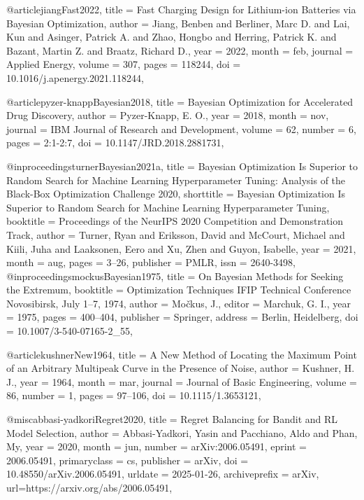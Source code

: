 @article{jiangFast2022,
  title = {Fast Charging Design for {{Lithium-ion}} Batteries via {{Bayesian}} Optimization},
  author = {Jiang, Benben and Berliner, Marc D. and Lai, Kun and Asinger, Patrick A. and Zhao, Hongbo and Herring, Patrick K. and Bazant, Martin Z. and Braatz, Richard D.},
  year = {2022},
  month = feb,
  journal = {Applied Energy},
  volume = {307},
  pages = {118244},
  doi = {10.1016/j.apenergy.2021.118244},
}

@article{pyzer-knappBayesian2018,
  title = {Bayesian Optimization for Accelerated Drug Discovery},
  author = {{Pyzer-Knapp}, E. O.},
  year = {2018},
  month = nov,
  journal = {IBM Journal of Research and Development},
  volume = {62},
  number = {6},
  pages = {2:1-2:7},
  doi = {10.1147/JRD.2018.2881731},
}

@inproceedings{turnerBayesian2021a,
  title = {Bayesian {{Optimization}} Is {{Superior}} to {{Random Search}} for {{Machine Learning Hyperparameter Tuning}}: {{Analysis}} of the {{Black-Box Optimization Challenge}} 2020},
  shorttitle = {Bayesian {{Optimization}} Is {{Superior}} to {{Random Search}} for {{Machine Learning Hyperparameter Tuning}}},
  booktitle = {Proceedings of the {{NeurIPS}} 2020 {{Competition}} and {{Demonstration Track}}},
  author = {Turner, Ryan and Eriksson, David and McCourt, Michael and Kiili, Juha and Laaksonen, Eero and Xu, Zhen and Guyon, Isabelle},
  year = {2021},
  month = aug,
  pages = {3--26},
  publisher = {PMLR},
  issn = {2640-3498},
}
@inproceedings{mockusBayesian1975,
  title = {On Bayesian Methods for Seeking the Extremum},
  booktitle = {Optimization {{Techniques IFIP Technical Conference Novosibirsk}}, {{July}} 1--7, 1974},
  author = {Mo{\v c}kus, J.},
  editor = {Marchuk, G. I.},
  year = {1975},
  pages = {400--404},
  publisher = {Springer},
  address = {Berlin, Heidelberg},
  doi = {10.1007/3-540-07165-2_55},
}

@article{kushnerNew1964,
  title = {A {{New Method}} of {{Locating}} the {{Maximum Point}} of an {{Arbitrary Multipeak Curve}} in the {{Presence}} of {{Noise}}},
  author = {Kushner, H. J.},
  year = {1964},
  month = mar,
  journal = {Journal of Basic Engineering},
  volume = {86},
  number = {1},
  pages = {97--106},
  doi = {10.1115/1.3653121},
}

@misc{abbasi-yadkoriRegret2020,
  title = {Regret {{Balancing}} for {{Bandit}} and {{RL Model Selection}}},
  author = {{Abbasi-Yadkori}, Yasin and Pacchiano, Aldo and Phan, My},
  year = {2020},
  month = jun,
  number = {arXiv:2006.05491},
  eprint = {2006.05491},
  primaryclass = {cs},
  publisher = {arXiv},
  doi = {10.48550/arXiv.2006.05491},
  urldate = {2025-01-26},
  archiveprefix = {arXiv},
  url={https://arxiv.org/abs/2006.05491}, 
}

